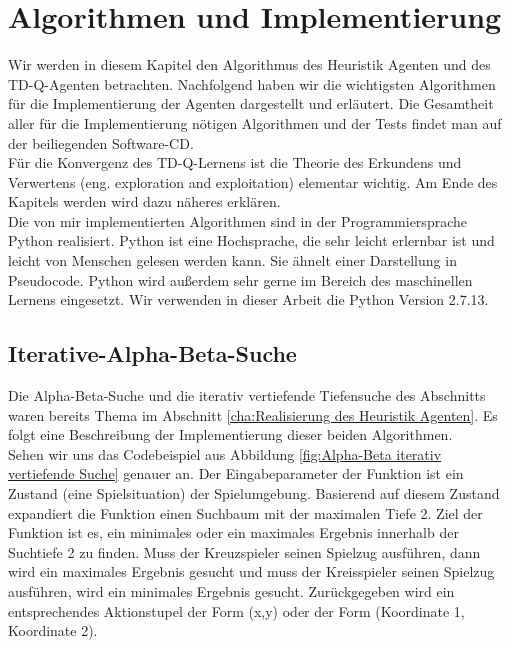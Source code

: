 \chapter{Algorithmen und Implementierung}
\label{cha:Algorithmen und Implementierung}

Wir werden in diesem Kapitel den Algorithmus des Heuristik Agenten und des TD-Q-Agenten betrachten. Nachfolgend haben wir die wichtigsten Algorithmen für die Implementierung der Agenten dargestellt und erläutert. Die Gesamtheit aller für die Implementierung nötigen Algorithmen und der Tests findet man auf der beiliegenden Software-CD. \\

Für die Konvergenz des TD-Q-Lernens ist die Theorie des Erkundens und Verwertens (eng. exploration and exploitation) elementar wichtig. Am Ende des Kapitels werden wird dazu näheres erklären. \\

Die von mir implementierten Algorithmen sind in der Programmiersprache Python realisiert. Python ist eine Hochsprache, die sehr leicht erlernbar ist und leicht von Menschen gelesen werden kann. Sie ähnelt einer Darstellung in Pseudocode. Python wird außerdem sehr gerne im Bereich des maschinellen Lernens eingesetzt. Wir verwenden in dieser Arbeit die Python Version 2.7.13. \\

\section{Iterative-Alpha-Beta-Suche}
Die Alpha-Beta-Suche und die iterativ vertiefende Tiefensuche des Abschnitts waren bereits Thema im Abschnitt \ref{cha:Realisierung des Heuristik Agenten}. Es folgt eine Beschreibung der Implementierung dieser beiden Algorithmen.\\

Sehen wir uns das Codebeispiel aus Abbildung \ref{fig:Alpha-Beta iterativ vertiefende Suche} genauer an. Der Eingabeparameter der Funktion ist ein Zustand (eine Spielsituation) der Spielumgebung. Basierend auf diesem Zustand expandiert die Funktion einen Suchbaum mit der maximalen Tiefe 2. Ziel der Funktion ist es, ein minimales oder ein maximales Ergebnis innerhalb der Suchtiefe 2 zu finden. Muss der Kreuzspieler seinen Spielzug ausführen, dann wird ein maximales Ergebnis gesucht und muss der Kreisspieler seinen Spielzug ausführen, wird ein minimales Ergebnis gesucht. Zurückgegeben wird ein entsprechendes Aktionstupel der Form (x,y) oder der Form (Koordinate 1, Koordinate 2). \\

